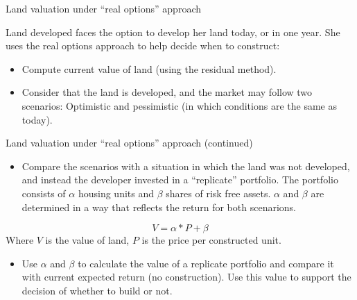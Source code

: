 \documentclass[ignorenonframetext,]{beamer}
\providecommand{\tightlist}{%
\setlength{\itemsep}{0pt}\setlength{\parskip}{0pt}}
\begin{document}
\begin{frame}{Land valuation under ``real options'' approach}

\normalsize

Land developed faces the option to develop her land today, or in one
year. She uses the real options approach to help decide when to
construct:

\begin{itemize}
\tightlist
\item
  Compute current value of land (using the residual method).
\item
  Consider that the land is developed, and the market may follow two
  scenarios: Optimistic and pessimistic (in which conditions are the
  same as today).
\end{itemize}

\end{frame}

\begin{frame}{Land valuation under ``real options'' approach
(continued)}

\normalsize

\begin{itemize}
\tightlist
\item
  Compare the scenarios with a situation in which the land was not
  developed, and instead the developer invested in a ``replicate''
  portfolio. The portfolio consists of \(\alpha\) housing units and
  \(\beta\) shares of risk free assets. \(\alpha\) and \(\beta\) are
  determined in a way that reflects the return for both scenarions.
\end{itemize}

\[ V = \alpha*P + \beta \] Where \(V\) is the value of land, \(P\) is
the price per constructed unit.

\begin{itemize}
\tightlist
\item
  Use \(\alpha\) and \(\beta\) to calculate the value of a replicate
  portfolio and compare it with current expected return (no
  construction). Use this value to support the decision of whether to
  build or not.
\end{itemize}

\end{frame}
\end{document}
